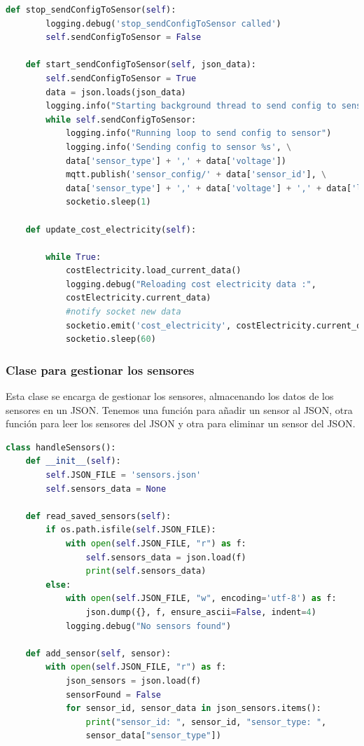 \begin{titlepage}
\begin{lstlisting}[language=python]
    def stop_sendConfigToSensor(self):
        logging.debug('stop_sendConfigToSensor called')
        self.sendConfigToSensor = False

    def start_sendConfigToSensor(self, json_data):
        self.sendConfigToSensor = True
        data = json.loads(json_data)
        logging.info("Starting background thread to send config to sensor")
        while self.sendConfigToSensor:
            logging.info("Running loop to send config to sensor")
            logging.info('Sending config to sensor %s', \
			data['sensor_type'] + ',' + data['voltage'])
            mqtt.publish('sensor_config/' + data['sensor_id'], \
            data['sensor_type'] + ',' + data['voltage'] + ',' + data['load_type'])
            socketio.sleep(1)
    
    def update_cost_electricity(self):
        
        while True:
            costElectricity.load_current_data()
            logging.debug("Reloading cost electricity data :", 
			costElectricity.current_data)
            #notify socket new data
            socketio.emit('cost_electricity', costElectricity.current_data)
            socketio.sleep(60)
\end{lstlisting}

\subsubsection{Clase para gestionar los sensores}
Esta clase se encarga de gestionar los sensores, almacenando los datos de los sensores en un JSON. Tenemos una función para añadir un sensor al JSON, otra función para leer los sensores del JSON y otra para eliminar un sensor del JSON.\\

\begin{lstlisting}[language=python]
class handleSensors():
    def __init__(self):
        self.JSON_FILE = 'sensors.json'
        self.sensors_data = None
    
    def read_saved_sensors(self):
        if os.path.isfile(self.JSON_FILE):
            with open(self.JSON_FILE, "r") as f:
                self.sensors_data = json.load(f)
                print(self.sensors_data)
        else:
            with open(self.JSON_FILE, "w", encoding='utf-8') as f:
                json.dump({}, f, ensure_ascii=False, indent=4)
            logging.debug("No sensors found")

    def add_sensor(self, sensor):
        with open(self.JSON_FILE, "r") as f:
            json_sensors = json.load(f)
            sensorFound = False
            for sensor_id, sensor_data in json_sensors.items():
                print("sensor_id: ", sensor_id, "sensor_type: ", 
				sensor_data["sensor_type"])


\end{lstlisting}
\end{titlepage}
